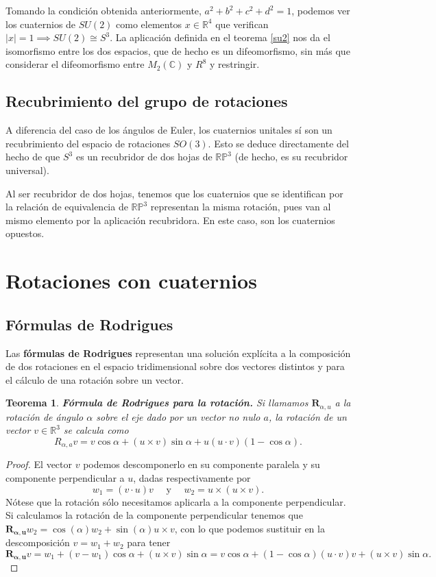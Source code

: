 \documentclass{article}
\theoremstyle{plain}
\newtheorem{theorem}{Teorema}
\theoremstyle{definition}
\theoremstyle{remark}
\begin{document}
Tomando la condición obtenida anteriormente, $a^2+b^2+c^2+d^2 = 1$,
podemos ver los cuaternios de $SU(2)$ como elementos
$x \in \mathbb R^4$ que verifican
$\left|x\right| = 1 \implies SU(2) \cong S^3$. La aplicación definida
en el teorema \ref{su2} nos da el isomorfismo entre los dos espacios,
que de hecho es un difeomorfismo, sin más que considerar el
difeomorfismo entre $M_2(\mathbb C)$ y $R^8$ y restringir.


\subsection{Recubrimiento del grupo de rotaciones}

A diferencia del caso de los ángulos de Euler, los cuaternios unitales
sí son un recubrimiento del espacio de rotaciones $SO(3)$. Esto se
deduce directamente del hecho de que $S^3$ es un recubridor de dos
hojas de $\mathbb{RP}^3$ (de hecho, es su recubridor universal).

Al ser recubridor de dos hojas, tenemos que los cuaternios que se
identifican por la relación de equivalencia de $\mathbb{RP}^3$
representan la misma rotación, pues van al mismo elemento por la
aplicación recubridora. En este caso, son los cuaternios opuestos.


\section{Rotaciones con cuaternios}
\subsection{Fórmulas de Rodrigues}
Las \textbf{fórmulas de Rodrigues} representan una solución explícita
a la composición de dos rotaciones en el espacio tridimensional sobre
dos vectores distintos y para el cálculo de una rotación sobre un
vector.

\begin{theorem}
  \textbf{Fórmula de Rodrigues para la rotación.} Si llamamos
  $\mathbf{R}_{\alpha,u}$ a la rotación de ángulo $\alpha$ sobre el
  eje dado por un vector no nulo $a$, la rotación de un vector
  $v \in\mathbb{R}^3$ se calcula como
  \[R_{\alpha,a}v = v \cos \alpha + (u \times v)\sin \alpha + u(u\cdot v)(1-\cos\alpha).\]
\end{theorem}
\begin{proof}
  El vector $v$ podemos descomponerlo en su componente paralela y su
  componente perpendicular a $u$, dadas respectivamente por
  \[w_1 = (v \cdot u) v \quad \text{ y } \quad w_2 = u \times (u \times v).\]
  Nótese que la rotación sólo necesitamos aplicarla a
  la componente perpendicular. Si calculamos la rotación de la
  componente perpendicular tenemos que
  $\mathbf{R_{\alpha,u}} w_2 = \cos(\alpha) w_2 + \sin(\alpha) u \times v$, con
  lo que podemos sustituir en la descomposición $v = w_1+w_2$ para
  tener
  \[\mathbf{R_{\alpha,u}}v =
    w_1 + (v-w_1)\cos\alpha + (u \times v)\sin\alpha =
    v\cos\alpha + (1-\cos \alpha)(u \cdot v)v + (u \times v)\sin\alpha.
  \]
\end{proof}
\end{document}
